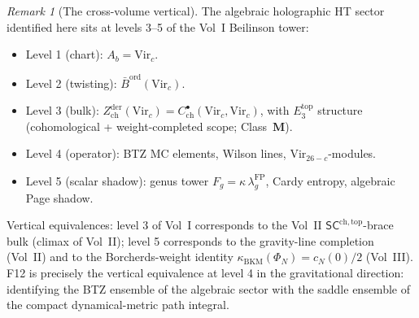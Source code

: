 \documentclass[11pt,reqno]{amsart}
\theoremstyle{definition}
\theoremstyle{remark}
\newtheorem{remark}[theorem]{Remark}
\providecommand{\Vir}{\mathrm{Vir}}
\providecommand{\barB}{\bar{B}}
\begin{document}
\begin{remark}[The cross-volume vertical]
\label{rem:cross-volume-vertical}
The algebraic holographic HT sector identified here sits at
levels 3--5 of the Vol~I Beilinson tower:
\begin{itemize}
\item Level 1 (chart): $A_b = \Vir_c$.
\item Level 2 (twisting): $\barB^{\mathrm{ord}}(\Vir_c)$.
\item Level 3 (bulk):
  $Z^{\mathrm{der}}_{\mathrm{ch}}(\Vir_c)
  =C^\bullet_{\mathrm{ch}}(\Vir_c,\Vir_c)$, with
  $E_3^{\mathrm{top}}$ structure
  (cohomological + weight-completed scope; Class~$\mathbf M$).
\item Level 4 (operator): BTZ MC elements, Wilson lines,
  $\Vir_{26-c}$-modules.
\item Level 5 (scalar shadow): genus tower
  $F_g = \kappa\,\lambda_g^{\mathrm{FP}}$, Cardy entropy,
  algebraic Page shadow.
\end{itemize}
Vertical equivalences: level 3 of Vol~I corresponds to the
Vol~II $\mathsf{SC}^{\mathrm{ch,top}}$-brace bulk (climax of
Vol~II); level 5 corresponds to the gravity-line completion
(Vol~II) and to the Borcherds-weight identity
$\kappa_{\mathrm{BKM}}(\Phi_N) = c_N(0)/2$ (Vol~III). F12 is
precisely the vertical equivalence at level 4 in the gravitational
direction: identifying the BTZ ensemble of the algebraic sector
with the saddle ensemble of the compact dynamical-metric path
integral.
\end{remark}
\end{document}
